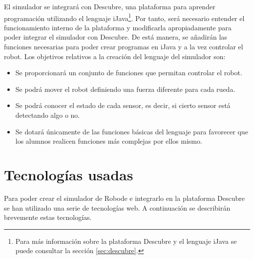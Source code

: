 El simulador se integrará con Descubre, una plataforma para aprender programación utilizando el lenguaje iJava\footnote{Para más información sobre la plataforma Descubre y el lenguaje iJava se puede consultar la sección \ref{sec:descubre}.}. Por tanto, será necesario entender el funcionamiento interno de la plataforma y modificarla apropiadamente para poder integrar el simulador con Descubre. De está manera, se añadirán las funciones necesarias para poder crear programas en iJava y a la vez controlar el robot. Los objetivos relativos a la creación del lenguaje del simulador son:

\begin{itemize}
	\item Se proporcionará un conjunto de funciones que permitan controlar el robot.
	\item Se podrá mover el robot definiendo una fuerza diferente para cada rueda.
	\item Se podrá conocer el estado de cada sensor, es decir, si cierto sensor está detectando algo o no.
	\item Se dotará únicamente de las funciones básicas del lenguaje para favorecer que los alumnos realicen funciones más complejas por ellos mismo.
\end{itemize}


%
%


\section{Tecnologías usadas}
\label{sec:tecnologias}

Para poder crear el simulador de Robode e integrarlo en la plataforma Descubre se han utilizado una serie de tecnologías web. A continuación se describirán brevemente estas tecnologías.

